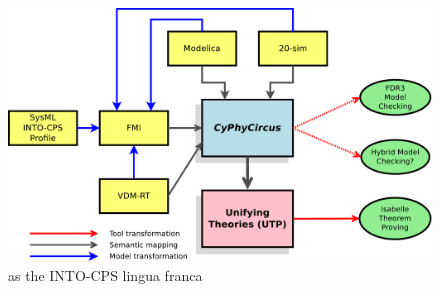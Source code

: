 \begin{figure}
  \begin{center}
    \includegraphics[width=14cm]{CyPhyCircus}
  \end{center}
  \caption{\CyPhyCircus as the INTO-CPS lingua franca}
  \label{fig:CyPhyCircus}
\end{figure}

